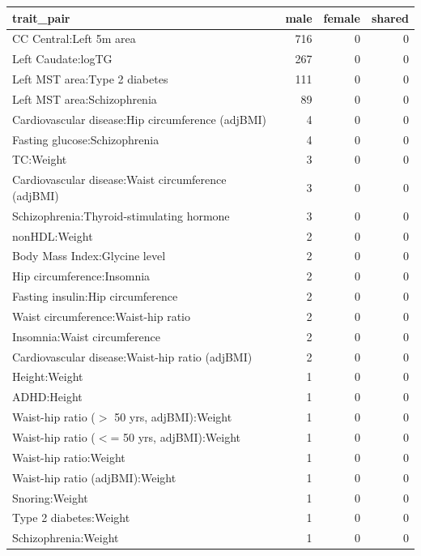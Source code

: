\begin{table}[ht]
\centering
\begin{tabular}{lrrr}
  \hline
trait\_pair & male & female & shared \\ 
  \hline
CC Central:Left 5m area & 716 &   0 &   0 \\ 
  Left Caudate:logTG & 267 &   0 &   0 \\ 
  Left MST area:Type 2 diabetes & 111 &   0 &   0 \\ 
  Left MST area:Schizophrenia &  89 &   0 &   0 \\ 
  Cardiovascular disease:Hip circumference (adjBMI) &   4 &   0 &   0 \\ 
  Fasting glucose:Schizophrenia &   4 &   0 &   0 \\ 
  TC:Weight &   3 &   0 &   0 \\ 
  Cardiovascular disease:Waist circumference (adjBMI) &   3 &   0 &   0 \\ 
  Schizophrenia:Thyroid-stimulating hormone &   3 &   0 &   0 \\ 
  nonHDL:Weight &   2 &   0 &   0 \\ 
  Body Mass Index:Glycine level &   2 &   0 &   0 \\ 
  Hip circumference:Insomnia &   2 &   0 &   0 \\ 
  Fasting insulin:Hip circumference &   2 &   0 &   0 \\ 
  Waist circumference:Waist-hip ratio &   2 &   0 &   0 \\ 
  Insomnia:Waist circumference &   2 &   0 &   0 \\ 
  Cardiovascular disease:Waist-hip ratio (adjBMI) &   2 &   0 &   0 \\ 
  Height:Weight &   1 &   0 &   0 \\ 
  ADHD:Height &   1 &   0 &   0 \\ 
  Waist-hip ratio ($>$ 50 yrs, adjBMI):Weight &   1 &   0 &   0 \\ 
  Waist-hip ratio ($<$= 50 yrs, adjBMI):Weight &   1 &   0 &   0 \\ 
  Waist-hip ratio:Weight &   1 &   0 &   0 \\ 
  Waist-hip ratio (adjBMI):Weight &   1 &   0 &   0 \\ 
  Snoring:Weight &   1 &   0 &   0 \\ 
  Type 2 diabetes:Weight &   1 &   0 &   0 \\ 
  Schizophrenia:Weight &   1 &   0 &   0 \\ 

\end{tabular}
\end{table}
